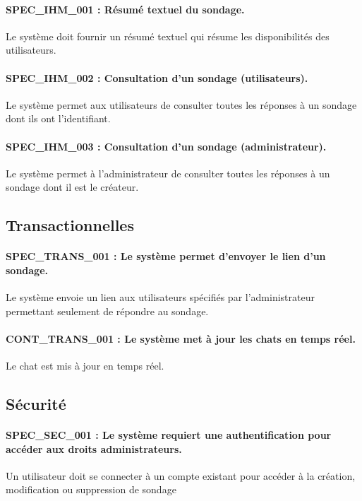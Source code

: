 \documentclass[]{report}
\begin{document}
\paragraph{SPEC\_IHM\_001 : Résumé textuel du sondage.}
Le système doit fournir un résumé textuel qui résume les disponibilités des utilisateurs.

\paragraph{SPEC\_IHM\_002 : Consultation d’un sondage (utilisateurs).}
Le système permet aux utilisateurs de consulter toutes les réponses à un sondage dont ils ont l’identifiant.

\paragraph{SPEC\_IHM\_003 : Consultation d’un sondage (administrateur).}
Le système permet à l’administrateur de consulter toutes les réponses à un sondage dont il est le créateur.

\subsection{Transactionnelles}

\paragraph{SPEC\_TRANS\_001 : Le système permet d'envoyer le lien d’un sondage.}
Le système envoie un lien aux utilisateurs spécifiés par l'administrateur permettant seulement de répondre au sondage.

\paragraph{CONT\_TRANS\_001 : Le système met à jour les chats en temps réel.}
Le chat est mis à jour en temps réel.

\subsection{Sécurité}
\paragraph{SPEC\_SEC\_001 : Le système requiert une authentification pour accéder aux droits administrateurs.}
Un utilisateur doit se connecter à un compte existant pour accéder à la création, modification ou suppression de sondage
\end{document}
